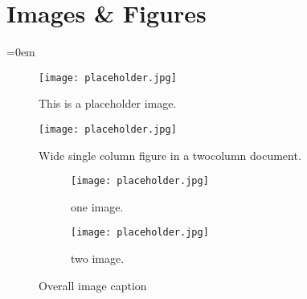 \section{Images \& Figures}
\label{sec:images_&_figures}
\parindent=0em

\lipsum[1]


\begin{figure}[h!]
  \texttt{[image: placeholder.jpg]}
  \caption{This is a placeholder image.}
  \label{fig:placeholder}
\end{figure}


\lipsum[1]


\begin{figure*}[ht]
\centering
\texttt{[image: placeholder.jpg]}
\caption{Wide single column figure in a twocolumn document.}
\end{figure*}


\lipsum


\begin{figure}[h!]
  \centering
  \begin{subfigure}[b]{0.4\linewidth}
    \texttt{[image: placeholder.jpg]}
    \caption{one image.}
  \end{subfigure}
  \begin{subfigure}[b]{0.4\linewidth}
    \texttt{[image: placeholder.jpg]}
    \caption{two image.}
  \end{subfigure}
  \caption{Overall image caption}
\end{figure}


\sectionend

